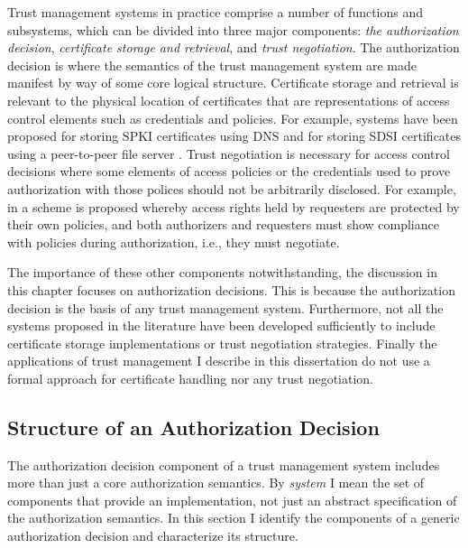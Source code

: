 Trust management systems in practice comprise a number of functions and subsystems, which can be
divided into three major components: \emph{the authorization decision}, \emph{certificate
  storage and retrieval}, and \emph{trust negotiation}. The authorization decision is where the
semantics of the trust management system are made manifest by way of some core logical
structure. Certificate storage and retrieval is relevant to the physical location of
certificates that are representations of access control elements such as credentials and
policies. For example, systems have been proposed for storing SPKI certificates using DNS
\cite{nikander98storing} and for storing SDSI certificates using a peer-to-peer file server
\cite{ajmani02conchord}. Trust negotiation
\cite{Winsborough:ATN,Yu:PECSATNI,Seamons:LDACPATN,Yu:ISATN,Winsborough:TPATN,Winsborough:SATN}
is necessary for access control decisions where some elements of access policies or the
credentials used to prove authorization with those polices should not be arbitrarily disclosed.
For example, in \cite{Winsborough:ATN} a scheme is proposed whereby access rights held by
requesters are protected by their own policies, and both authorizers and requesters must show
compliance with policies during authorization, i.e., they must negotiate.

The importance of these other components notwithstanding, the discussion in this chapter focuses
on authorization decisions. This is because the authorization decision is the basis of any trust
management system. Furthermore, not all the systems proposed in the literature have been
developed sufficiently to include certificate storage implementations or trust negotiation
strategies. Finally the applications of trust management I describe in this dissertation do not
use a formal approach for certificate handling nor any trust negotiation.

\subsection{Structure of an Authorization Decision}
\label{section-components-structure}

The authorization decision component of a trust management system includes more than just a core
authorization semantics. By \emph{system} I mean the set of components that provide an
implementation, not just an abstract specification of the authorization semantics. In this
section I identify the components of a generic authorization decision and characterize its
structure.

